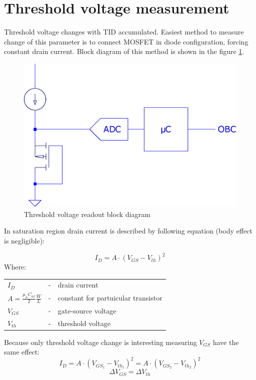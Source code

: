 \section{Threshold voltage measurement}
    Threshold voltage changes with TID accumulated. Easiest method to measure change of this parameter is to connect MOSFET in diode configuration, forcing constant drain current. Block diagram of this method is shown in the figure \ref{Vth_readout_block_diagram}.

    \begin{figure}[H]
        \centering
        \includegraphics[width=0.3\paperwidth]{img/05/conceptual_block_diagram.eps}
        \caption{Threshold voltage readout block diagram}
        \label{Vth_readout_block_diagram}
    \end{figure}

    In saturation region drain current is described by following equation (body effect is negligible):

    $$I_D = A \cdot (V_{GS} - V_{th})^2$$
    Where:

    \begin{tabular}{lcl}
        $I_D$ & - & drain current \\
        $A = \frac{\mu_n C_{ox}}{2} \frac{W}{L}$ & - & constant for partuicular transistor \\
        $V_{GS}$ & - & gate-source voltage \\
        $V_{th}$ & - & threshold voltage \\
    \end{tabular}
    \bigskip

    Because only threshold voltage change is interesting measuring $V_{GS}$ have the same effect:
    $$I_D = A \cdot (V_{GS_1} - V_{th_1})^2 = A \cdot (V_{GS_2} - V_{th_2})^2$$
    $$\Delta V_{GS} = \Delta V_{th}$$

